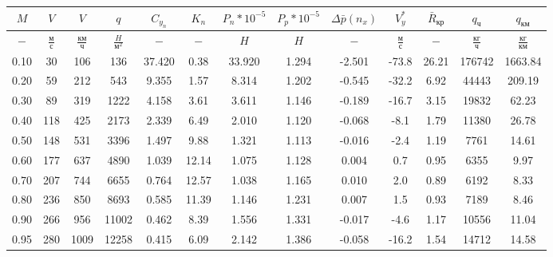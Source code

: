 \begin{tabular}{|c|c|c|c|c|c|c|c|c|c|c|c|c|}
\hline
$M$ & $V$ & $V$ & $q$ & $C_{y_n}$ & $K_n$ & $P_n*10^{-5}$ & $P_p*10^{-5}$ & $\Delta \bar{p}(n_x)$ & $V_y^*$ & $\bar{R}_{кр}$ & $q_{ч}$ & $q_{км}$ \\ 
\hline
$-$ & $\frac{м}{с}$ & $\frac{км}{ч}$ & $\frac{H}{м^2}$ & $-$ & $-$ & $H$ & $H$ & $-$ & $\frac{м}{с}$ & $-$ & $\frac{кг}{ч}$ & $\frac{кг}{км}$ \\ 
\hline
0.10 & 30 & 106 & 136 & 37.420 & 0.38 & 33.920 & 1.294 & -2.501 & -73.8 & 26.21 & 176742 & 1663.84 \\ 
\hline
0.20 & 59 & 212 & 543 & 9.355 & 1.57 & 8.314 & 1.202 & -0.545 & -32.2 & 6.92 & 44443 & 209.19 \\ 
\hline
0.30 & 89 & 319 & 1222 & 4.158 & 3.61 & 3.611 & 1.146 & -0.189 & -16.7 & 3.15 & 19832 & 62.23 \\ 
\hline
0.40 & 118 & 425 & 2173 & 2.339 & 6.49 & 2.010 & 1.120 & -0.068 & -8.1 & 1.79 & 11380 & 26.78 \\ 
\hline
0.50 & 148 & 531 & 3396 & 1.497 & 9.88 & 1.321 & 1.113 & -0.016 & -2.4 & 1.19 & 7761 & 14.61 \\ 
\hline
0.60 & 177 & 637 & 4890 & 1.039 & 12.14 & 1.075 & 1.128 & 0.004 & 0.7 & 0.95 & 6355 & 9.97 \\ 
\hline
0.70 & 207 & 744 & 6655 & 0.764 & 12.57 & 1.038 & 1.165 & 0.010 & 2.0 & 0.89 & 6192 & 8.33 \\ 
\hline
0.80 & 236 & 850 & 8693 & 0.585 & 11.39 & 1.146 & 1.231 & 0.007 & 1.5 & 0.93 & 7189 & 8.46 \\ 
\hline
0.90 & 266 & 956 & 11002 & 0.462 & 8.39 & 1.556 & 1.331 & -0.017 & -4.6 & 1.17 & 10556 & 11.04 \\ 
\hline
0.95 & 280 & 1009 & 12258 & 0.415 & 6.09 & 2.142 & 1.386 & -0.058 & -16.2 & 1.54 & 14712 & 14.58 \\ 
\hline
\end{tabular}